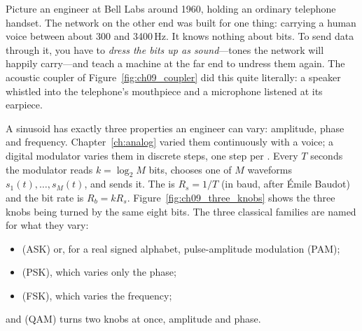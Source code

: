 Picture an engineer at Bell Labs around 1960, holding an ordinary telephone handset. The
network on the other end was built for one thing: carrying a human voice between about 300 and
3400\,Hz. It knows nothing about bits. To send data through it, you have to \emph{dress the bits
up as sound}---tones the network will happily carry---and teach a machine at the far end to undress
them again. The acoustic coupler of Figure~\ref{fig:ch09_coupler} did this quite literally: a
speaker whistled into the telephone's mouthpiece and a microphone listened at its earpiece.


A sinusoid has exactly three properties an engineer can vary: amplitude, phase and frequency.
Chapter~\ref{ch:analog} varied them continuously with a voice; a digital modulator varies them in
discrete steps, one step per . Every $T$ seconds the modulator reads $k=\log_2 M$
bits, chooses one of $M$ waveforms $s_1(t),\dots,s_M(t)$, and sends it. The  is
$R_s=1/T$ (in baud, after \'Emile Baudot) and the bit rate is $R_b=kR_s$.
Figure~\ref{fig:ch09_three_knobs} shows the three knobs being turned by the same eight bits. The
three classical families are named for what they vary:
\begin{itemize}
\item {} (ASK) or, for a real signed alphabet, pulse-amplitude
modulation (PAM);
\item {} (PSK), which varies only the phase;
\item {} (FSK), which varies the frequency;
\end{itemize}
and  (QAM) turns two knobs at once, amplitude and phase.


